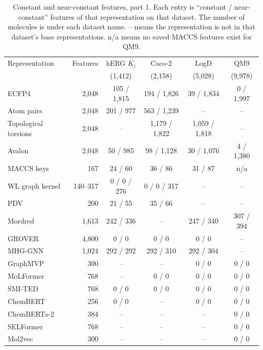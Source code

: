 \begin{table}[htbp]
\centering
\small
\setlength{\tabcolsep}{4pt}
\caption{Constant and near-constant features, part 1. Each entry is ``constant / near-constant'' features of that representation on that dataset. The number of molecules is under each dataset name. -- means the representation is not in that dataset's base representations. n/a means no saved MACCS features exist for QM9.}
\label{tab:constant_features}
\begin{tabular}{lrcccc}
\toprule
Representation & Features & hERG $K_i$ & Caco-2 & LogD & QM9 \\
 & & (1,412) & (2,158) & (5,028) & (9,978) \\
\midrule
ECFP4 & 2,048 & 105 / 1,815 & 194 / 1,826 & 39 / 1,834 & 0 / 1,997 \\
Atom pairs & 2,048 & 201 / 977 & 563 / 1,239 & -- & -- \\
Topological torsions & 2,048 & -- & 1,179 / 1,822 & 1,059 / 1,818 & -- \\
Avalon & 2,048 & 50 / 985 & 98 / 1,128 & 30 / 1,076 & 4 / 1,380 \\
MACCS keys & 167 & 24 / 60 & 36 / 86 & 31 / 87 & n/a \\
WL graph kernel & 140--317 & 0 / 0 / 276 & 0 / 0 / 317 & -- & -- \\
PDV & 200 & 21 / 55 & 35 / 66 & -- & -- \\
Mordred & 1,613 & 242 / 336 & -- & 247 / 340 & 307 / 394 \\
GROVER & 4,800 & 0 / 0 & 0 / 0 & 0 / 0 & -- \\
MHG-GNN & 1,024 & 292 / 292 & 292 / 310 & 292 / 304 & -- \\
GraphMVP & 300 & -- & -- & 0 / 0 & 0 / 0 \\
MoLFormer & 768 & -- & 0 / 0 & 0 / 0 & 0 / 0 \\
SMI-TED & 768 & 0 / 0 & 0 / 0 & 0 / 0 & 0 / 0 \\
ChemBERT & 256 & 0 / 0 & -- & 0 / 0 & 0 / 0 \\
ChemBERTa-2 & 384 & -- & -- & -- & 0 / 0 \\
SELFormer & 768 & -- & -- & -- & 0 / 0 \\
Mol2vec & 300 & -- & -- & -- & 0 / 0 \\
\bottomrule
\end{tabular}
\end{table}

